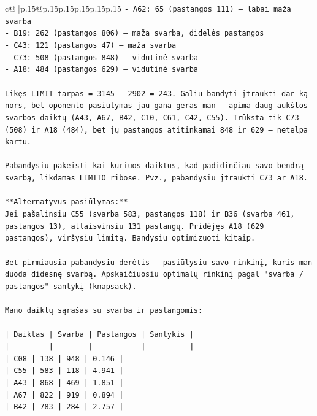 \documentclass{article}
\begin{document}
{\begin{supertabular}{c@{$\;$}|p{.15\linewidth}@{}p{.15\linewidth}p{.15\linewidth}p{.15\linewidth}p{.15\linewidth}p{.15\linewidth}}
{{{\texttt{{-} A62: 65 (pastangos 111) – labai maža svarba} \\
\texttt{{-} B19: 262 (pastangos 806) – maža svarba, didelės pastangos} \\
\texttt{{-} C43: 121 (pastangos 47) – maža svarba} \\
\texttt{{-} C73: 508 (pastangos 848) – vidutinė svarba} \\
\texttt{{-} A18: 484 (pastangos 629) – vidutinė svarba} \\
\\ 
\texttt{Likęs LIMIT tarpas = 3145 {-} 2902 = 243. Galiu bandyti įtraukti dar ką nors, bet oponento pasiūlymas jau gana geras man – apima daug aukštos svarbos daiktų (A43, A67, B42, C10, C61, C42, C55). Trūksta tik C73 (508) ir A18 (484), bet jų pastangos atitinkamai 848 ir 629 – netelpa kartu.} \\
\\ 
\texttt{Pabandysiu pakeisti kai kuriuos daiktus, kad padidinčiau savo bendrą svarbą, likdamas LIMITO ribose. Pvz., pabandysiu įtraukti C73 ar A18.} \\
\\ 
\texttt{**Alternatyvus pasiūlymas:**} \\
\texttt{Jei pašalinsiu C55 (svarba 583, pastangos 118) ir B36 (svarba 461, pastangos 13), atlaisvinsiu 131 pastangų. Pridėjęs A18 (629 pastangos), viršysiu limitą. Bandysiu optimizuoti kitaip.} \\
\\ 
\texttt{Bet pirmiausia pabandysiu derėtis – pasiūlysiu savo rinkinį, kuris man duoda didesnę svarbą. Apskaičiuosiu optimalų rinkinį pagal "svarba / pastangos" santykį (knapsack).} \\
\\ 
\texttt{Mano daiktų sąrašas su svarba ir pastangomis:} \\
\\ 
\texttt{| Daiktas | Svarba | Pastangos | Santykis |} \\
\texttt{|{-}{-}{-}{-}{-}{-}{-}{-}{-}|{-}{-}{-}{-}{-}{-}{-}{-}|{-}{-}{-}{-}{-}{-}{-}{-}{-}{-}{-}|{-}{-}{-}{-}{-}{-}{-}{-}{-}{-}|} \\
\texttt{| C08 | 138 | 948 | 0.146 |} \\
\texttt{| C55 | 583 | 118 | 4.941 |} \\
\texttt{| A43 | 868 | 469 | 1.851 |} \\
\texttt{| A67 | 822 | 919 | 0.894 |} \\
\texttt{| B42 | 783 | 284 | 2.757 |} \\
}}}
\end{supertabular}}
\end{document}
